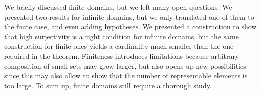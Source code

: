 We briefly discussed finite domains, but we left many open questions. We presented two results for infinite domains, but we only translated one of them to the finite case, and even adding hypotheses. We presented a construction to show that high surjectivity is a tight condition for infinite domains, but the same construction for finite ones yields a cardinality much smaller than the one required in the theorem. Finiteness introduces limitations because arbitrary composition of small sets may grow larger, but also opens up new possibilities since this may also allow to show that the number of representable elements is too large.
To sum up, finite domains still require a thorough study.
